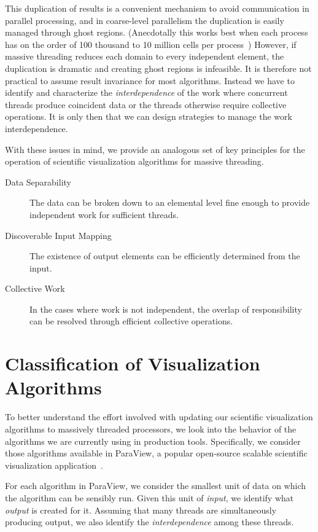 \documentclass{sig-alternate}
\newcommand*{\lcite}[1]{~\cite{#1}}
\newcommand*{\keyterm}[1]{\emph{#1}}
\begin{document}
This duplication of results is a convenient mechanism to avoid
communication in parallel processing, and in coarse-level parallelism the
duplication is easily managed through ghost regions. (Anecdotally this
works best when each process has on the order of 100 thousand to 10 million
cells per process\lcite{ParaViewTutorial}) However, if massive threading
reduces each domain to every independent element, the duplication is
dramatic and creating ghost regions is infeasible. It is therefore not
practical to assume result invariance for most algorithms. Instead we have
to identify and characterize the \keyterm{interdependence} of the work
where concurrent threads produce coincident data or the threads otherwise
require collective operations. It is only then that we can design
strategies to manage the work interdependence.

With these issues in mind, we provide an analogous set of key principles
for the operation of scientific visualization algorithms for massive
threading.

\begin{description}
\item[Data Separability] The data can be broken down to an elemental level
  fine enough to provide independent work for sufficient threads.
\item[Discoverable Input Mapping] The existence of output elements can be
  efficiently determined from the input.
\item[Collective Work] In the cases where work is not independent, the
  overlap of responsibility can be resolved through efficient collective
  operations.
\end{description}


\section{Classification of Visualization Algorithms}
\label{sec:Classification}

\noindent
To better understand the effort involved with updating our scientific
visualization algorithms to massively threaded processors, we look into the
behavior of the algorithms we are currently using in production
tools. Specifically, we consider those algorithms available in ParaView, a
popular open-source scalable scientific visualization
application\lcite{ParaView}.

For each algorithm in ParaView, we consider the smallest unit of data on
which the algorithm can be sensibly run. Given this unit of
\keyterm{input}, we identify what \keyterm{output} is created for
it. Assuming that many threads are simultaneously producing output, we also
identify the \keyterm{interdependence} among these threads.
\end{document}
